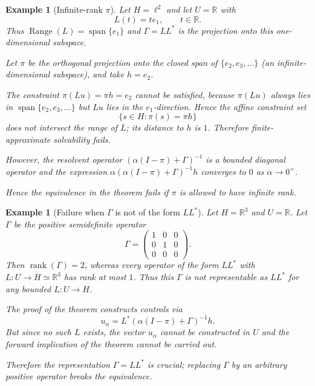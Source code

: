 \documentclass[12pt]{article}
\newtheorem{example}[theorem]{Example}
\DeclareMathOperator{\Range}{Range}
\DeclareMathOperator{\Span}{span}
\begin{document}
	\begin{example}[Infinite-rank \(\pi\)]
		Let \(H = \ell^{2}\) and let \(U = \mathbb{R}\) with
		\[
		L(t) = t e_{1}, \qquad t \in \mathbb{R}.
		\]
		Thus \(\Range(L) = \Span\{e_{1}\}\) and \(\Gamma = LL^{*}\) is the projection onto this one-dimensional subspace.
		
		Let \(\pi\) be the orthogonal projection onto the closed span of \(\{e_{2}, e_{3}, \dots\}\) (an infinite-dimensional subspace), and take \(h = e_{2}\).
		
		The constraint \(\pi(Lu) = \pi h = e_{2}\) cannot be satisfied, because \(\pi(Lu)\) always lies in \(\Span\{e_{2}, e_{3}, \dots\}\) but \(Lu\) lies in the \(e_{1}\)-direction. Hence the affine constraint set
		\[
		\{s \in H: \pi(s) = \pi h\}
		\]
		does not intersect the range of \(L\); its distance to \(h\) is \(1\). Therefore finite-approximate solvability fails.
		
		However, the resolvent operator \((\alpha(I-\pi)+\Gamma)^{-1}\) is a bounded diagonal operator and the expression \(\alpha(\alpha(I-\pi)+\Gamma)^{-1}h\) converges to \(0\) as \(\alpha \to 0^{+}\).
		
		Hence the equivalence in the theorem fails if \(\pi\) is allowed to have infinite rank.
	\end{example}
	
	\begin{example}[Failure when \(\Gamma\) is not of the form \(LL^{*}\)]
		Let \(H = \mathbb{R}^{3}\) and \(U = \mathbb{R}\). Let \(\Gamma\) be the positive semidefinite operator
		\[
		\Gamma =
		\begin{pmatrix}
			1 & 0 & 0\\
			0 & 1 & 0\\
			0 & 0 & 0
		\end{pmatrix}.
		\]
		Then \(\operatorname{rank}(\Gamma) = 2\), whereas every operator of the form \(LL^{*}\) with \(L: U \to H \simeq \mathbb{R}^{3}\) has rank at most \(1\). Thus this \(\Gamma\) is \emph{not} representable as \(LL^{*}\) for any bounded \(L: U \to H\).
		
		The proof of the theorem constructs controls via
		\[
		u_{\alpha} = L^{*}(\alpha(I-\pi)+\Gamma)^{-1}h.
		\]
		But since no such \(L\) exists, the vector \(u_{\alpha}\) cannot be constructed in \(U\) and the forward implication of the theorem cannot be carried out.
		
		Therefore the representation \(\Gamma = LL^{*}\) is crucial; replacing \(\Gamma\) by an arbitrary positive operator breaks the equivalence.
	\end{example}
	
\end{document}
